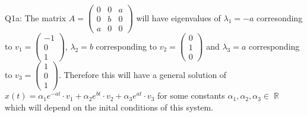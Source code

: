 \documentclass[letterpaper]{article}
\DeclareMathOperator{\R}{\mathbb{R}}
\begin{document}
\noindent Q1a: The matrix $A = \begin{pmatrix} 0 & 0 & a \\ 0 & b & 0 \\ a & 0 & 0 \end{pmatrix}$ will have eigenvalues of $\lambda_1 = -a$ corresonding to $v_1 = \begin{pmatrix} -1 \\ 0 \\ 1 \end{pmatrix}$, $\lambda_2 = b$ corresponding to $v_2 = \begin{pmatrix} 0 \\ 1 \\ 0 \end{pmatrix}$ and $\lambda_3 = a$ corresponding to $v_3 = \begin{pmatrix} 1\\ 0 \\ 1 \end{pmatrix}$. Therefore this will have a general solution of $x(t) = \alpha_1 e^{-at}\cdot v_1 + \alpha_2 e^{bt} \cdot v_2 +\alpha_3 e^{at}\cdot v_3$ for some constants $\alpha_1,\alpha_2,\alpha_3\in \R$ which will depend on the inital conditions of this system.  
\end{document}
